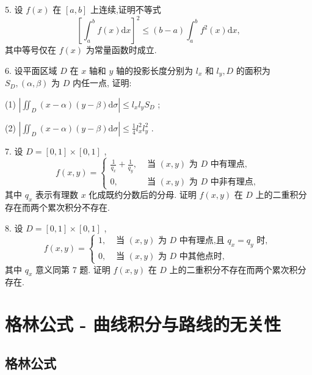 5. 设 \(f\left( x\right)\) 在 \(\left\lbrack  {a,b}\right\rbrack\) 上连续,证明不等式
\[
{\left\lbrack  {\int }_{a}^{b}f\left( x\right) \mathrm{d}x\right\rbrack  }^{2} \leq  \left( {b - a}\right) {\int }_{a}^{b}{f}^{2}\left( x\right) \mathrm{d}x,
\]
其中等号仅在 \(f\left( x\right)\) 为常量函数时成立.

6. 设平面区域 \(D\) 在 \(x\) 轴和 \(y\) 轴的投影长度分别为 \({l}_{x}\) 和 \({l}_{y},D\) 的面积为 \({S}_{D},\left( {\alpha ,\beta }\right)\) 为 \(D\) 内任一点, 证明:

(1) \(\left| {{\iint }_{D}\left( {x - \alpha }\right) \left( {y - \beta }\right) \mathrm{d}\sigma }\right|  \leq  {l}_{x}{l}_{y}{S}_{D}\) ;

(2) \(\left| {{\iint }_{D}\left( {x - \alpha }\right) \left( {y - \beta }\right) \mathrm{d}\sigma }\right|  \leq  \frac{1}{4}{l}_{x}^{2}{l}_{y}^{2}\) .

7. 设 \(D = \left\lbrack  {0,1}\right\rbrack   \times  \left\lbrack  {0,1}\right\rbrack\) ,
\[
f\left( {x,y}\right)  = \begin{cases} \frac{1}{{q}_{x}} + \frac{1}{{q}_{y}}, & \text{ 当 }\left( {x,y}\right) \text{ 为 }D\text{ 中有理点, } \\  0, & \text{ 当 }\left( {x,y}\right) \text{ 为 }D\text{ 中非有理点, } \end{cases}
\]
其中 \({q}_{x}\) 表示有理数 \(x\) 化成既约分数后的分母. 证明 \(f\left( {x,y}\right)\) 在 \(D\) 上的二重积分存在而两个累次积分不存在.

8. 设 \(D = \left\lbrack  {0,1}\right\rbrack   \times  \left\lbrack  {0,1}\right\rbrack\) ,
\[
f\left( {x,y}\right)  = \left\{  \begin{array}{ll} 1, & \text{ 当 }\left( {x,y}\right) \text{ 为 }D\text{ 中有理点,且 }{q}_{x} = {q}_{y}\text{ 时, } \\  0, & \text{ 当 }\left( {x,y}\right) \text{ 为 }D\text{ 中其他点时, } \end{array}\right.
\]
其中 \({q}_{x}\) 意义同第 7 题. 证明 \(f\left( {x,y}\right)\) 在 \(D\) 上的二重积分不存在而两个累次积分存在.

\section{格林公式 - 曲线积分与路线的无关性}

\subsection{格林公式}

